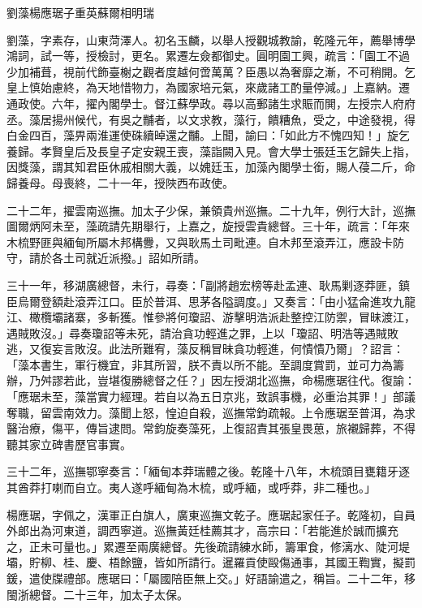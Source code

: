 
\begin{pinyinscope}
劉藻楊應琚子重英蘇爾相明瑞

劉藻，字素存，山東菏澤人。初名玉麟，以舉人授觀城教諭，乾隆元年，薦舉博學鴻詞，試一等，授檢討，更名。累遷左僉都御史。圓明園工興，疏言：「園工不過少加補葺，視前代飾臺榭之觀者度越何啻萬萬？臣愚以為奢靡之漸，不可稍開。乞皇上慎始慮終，為天地惜物力，為國家培元氣，來歲諸工酌量停減。」上嘉納。遷通政使。六年，擢內閣學士。督江蘇學政。尋以高郵諸生求賑而閧，左授宗人府府丞。藻居揚州候代，有吳之黼者，以文求教，藻行，饋糟魚，受之，中途發視，得白金四百，藻畀兩淮運使硃續晫還之黼。上聞，諭曰：「如此方不愧四知！」旋乞養歸。孝賢皇后及長皇子定安親王喪，藻詣闕入見。會大學士張廷玉乞歸失上指，因獎藻，謂其知君臣休戚相關大義，以媿廷玉，加藻內閣學士銜，賜人葠二斤，命歸養母。母喪終，二十一年，授陜西布政使。

二十二年，擢雲南巡撫。加太子少保，兼領貴州巡撫。二十九年，例行大計，巡撫圖爾炳阿未至，藻疏請先期舉行，上嘉之，旋授雲貴總督。三十年，疏言：「年來木梳野匪與緬甸所屬木邦構釁，又與耿馬土司毗連。自木邦至滾弄江，應設卡防守，請於各土司就近派撥。」詔如所請。

三十一年，移湖廣總督，未行，尋奏：「副將趙宏榜等赴孟連、耿馬剿逐莽匪，鎮臣烏爾登額赴滾弄江口。臣於普洱、思茅各隘調度。」又奏言：「由小猛侖進攻九龍江、橄欖壩諸寨，多斬獲。惟參將何瓊詔、游擊明浩派赴整控江防禦，冒昧渡江，遇賊敗沒。」尋奏瓊詔等未死，請治貪功輕進之罪，上以「瓊詔、明浩等遇賊敗逃，又復妄言敗沒。此法所難宥，藻反稱冒昧貪功輕進，何憒憒乃爾」？詔言：「藻本書生，軍行機宜，非其所習，朕不責以所不能。至調度賞罰，並可力為籌辦，乃舛謬若此，豈堪復勝總督之任？」因左授湖北巡撫，命楊應琚往代。復諭：「應琚未至，藻當實力經理。若自以為五日京兆，致誤事機，必重治其罪！」部議奪職，留雲南效力。藻聞上怒，惶迫自殺，巡撫常鈞疏報。上令應琚至普洱，為求醫治療，傷平，傳旨逮問。常鈞旋奏藻死，上復詔責其張皇畏葸，旅襯歸葬，不得聽其家立碑書歷官事實。

三十二年，巡撫鄂寧奏言：「緬甸本莽瑞體之後。乾隆十八年，木梳頭目甕籍牙逐其酋莽打喇而自立。夷人遂呼緬甸為木梳，或呼緬，或呼莽，非二種也。」

楊應琚，字佩之，漢軍正白旗人，廣東巡撫文乾子。應琚起家任子。乾隆初，自員外郎出為河東道，調西寧道。巡撫黃廷桂薦其才，高宗曰：「若能進於誠而擴充之，正未可量也。」累遷至兩廣總督。先後疏請練水師，籌軍食，修漓水、陡河堤壩，貯柳、桂、慶、梧餘鹽，皆如所請行。暹羅貢使毆傷通事，其國王鞫實，擬罰鍰，遣使牒禮部。應琚曰：「屬國陪臣無上交。」好語諭遣之，稱旨。二十二年，移閩浙總督。二十三年，加太子太保。


\end{pinyinscope}
